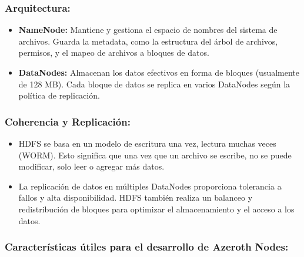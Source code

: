 \subsubsection{Arquitectura:}

\begin{itemize}
    \item \textbf{NameNode:} Mantiene y gestiona el espacio de nombres del sistema de archivos. Guarda la metadata, como la estructura del árbol de archivos, permisos, y el mapeo de archivos a bloques de datos.
    \item \textbf{DataNodes:} Almacenan los datos efectivos en forma de bloques (usualmente de 128 MB). Cada bloque de datos se replica en varios DataNodes según la política de replicación.
\end{itemize}

\subsubsection{Coherencia y Replicación:}

\begin{itemize}
    \item HDFS se basa en un modelo de escritura una vez, lectura muchas veces (WORM). Esto significa que una vez que un archivo se escribe, no se puede modificar, solo leer o agregar más datos.
    \item La replicación de datos en múltiples DataNodes proporciona tolerancia a fallos y alta disponibilidad. HDFS también realiza un balanceo y redistribución de bloques para optimizar el almacenamiento y el acceso a los datos.
\end{itemize}

\subsubsection{Características útiles para el desarrollo de Azeroth Nodes:}


